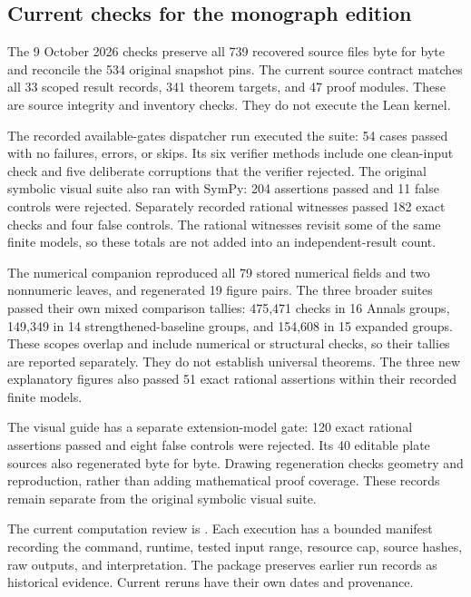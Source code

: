 \subsection{Current checks for the monograph edition}
The 9 October 2026 checks preserve all 739 recovered source files byte for byte and reconcile the 534 original snapshot pins. The current source contract matches all 33 scoped result records, 341 theorem targets, and 47 proof modules. These are source integrity and inventory checks. They do not execute the Lean kernel.

The recorded available-gates dispatcher run executed the  suite: 54 cases passed with no failures, errors, or skips. Its six verifier methods include one clean-input check and five deliberate corruptions that the verifier rejected. The original symbolic visual suite also ran with SymPy: 204 assertions passed and 11 false controls were rejected. Separately recorded rational witnesses passed 182 exact checks and four false controls. The rational witnesses revisit some of the same finite models, so these totals are not added into an independent-result count.

The numerical companion reproduced all 79 stored numerical fields and two nonnumeric leaves, and regenerated 19 figure pairs. The three broader suites passed their own mixed comparison tallies: 475,471 checks in 16 Annals groups, 149,349 in 14 strengthened-baseline groups, and 154,608 in 15 expanded groups. These scopes overlap and include numerical or structural checks, so their tallies are reported separately. They do not establish universal theorems. The three new explanatory figures also passed 51 exact rational assertions within their recorded finite models.

The visual guide has a separate extension-model gate: 120 exact rational assertions passed and eight false controls were rejected. Its 40 editable plate sources also regenerated byte for byte. Drawing regeneration checks geometry and reproduction, rather than adding mathematical proof coverage. These records remain separate from the original symbolic visual suite.

The current computation review is . Each execution has a bounded manifest recording the command, runtime, tested input range, resource cap, source hashes, raw outputs, and interpretation. The package preserves earlier run records as historical evidence. Current reruns have their own dates and provenance.

